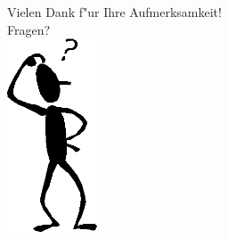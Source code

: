 \documentclass{beamer}
\begin{document}
\begin{frame}
\centering 
\huge{Vielen Dank f"ur Ihre Aufmerksamkeit!} \\
\huge{Fragen?}\\
\includegraphics[width=0.2\textwidth]{questionguy.png}


\end{frame}
\end{document}
